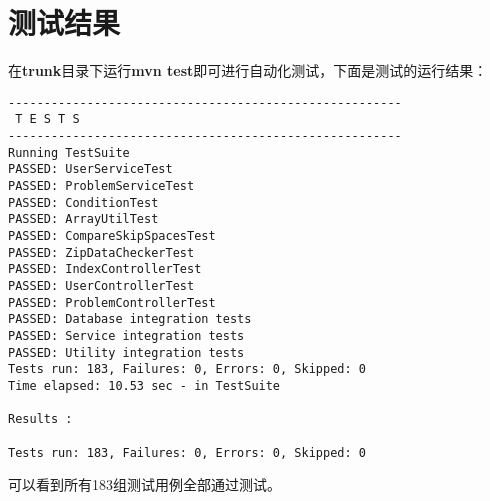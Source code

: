 \section{测试结果}
在\textbf{trunk}目录下运行\textbf{mvn test}即可进行自动化测试，下面是测试的运行结果：
\begin{verbatim}
-------------------------------------------------------
 T E S T S
-------------------------------------------------------
Running TestSuite
PASSED: UserServiceTest
PASSED: ProblemServiceTest
PASSED: ConditionTest
PASSED: ArrayUtilTest
PASSED: CompareSkipSpacesTest
PASSED: ZipDataCheckerTest
PASSED: IndexControllerTest
PASSED: UserControllerTest
PASSED: ProblemControllerTest
PASSED: Database integration tests
PASSED: Service integration tests
PASSED: Utility integration tests
Tests run: 183, Failures: 0, Errors: 0, Skipped: 0
Time elapsed: 10.53 sec - in TestSuite

Results :

Tests run: 183, Failures: 0, Errors: 0, Skipped: 0
\end{verbatim}
可以看到所有183组测试用例全部通过测试。